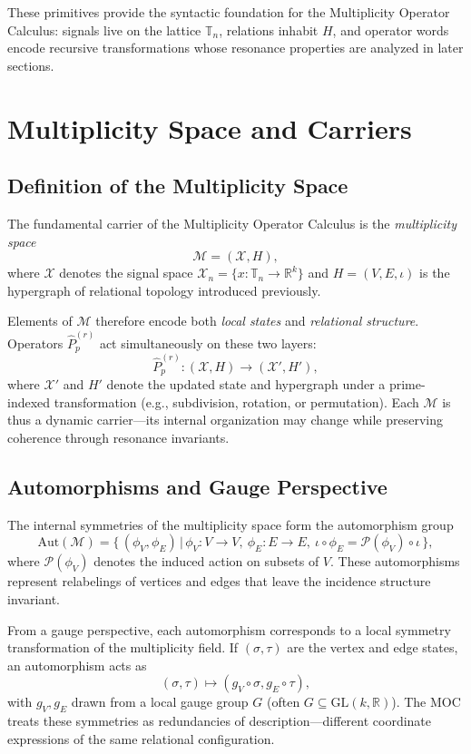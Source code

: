 \documentclass[12pt]{article}
\numberwithin{equation}{section}
\theoremstyle{plain}
\theoremstyle{definition}
\theoremstyle{remark}
\begin{document}
These primitives provide the syntactic foundation for the Multiplicity Operator Calculus: signals live on the lattice \(\mathbb{T}_n\), relations inhabit \(H\), and operator words encode recursive transformations whose resonance properties are analyzed in later sections.


\section*{Multiplicity Space and Carriers}

\subsection*{Definition of the Multiplicity Space}
The fundamental carrier of the Multiplicity Operator Calculus is the \emph{multiplicity space}
\[
\mathcal{M} = (\mathcal{X}, H),
\]
where \(\mathcal{X}\) denotes the signal space \(\mathcal{X}_n = \{x:\mathbb{T}_n \rightarrow \mathbb{R}^k\}\) and \(H = (V, E, \iota)\) is the hypergraph of relational topology introduced previously. 

Elements of \(\mathcal{M}\) therefore encode both \emph{local states} and \emph{relational structure}. Operators \(\hat{P}_p^{(r)}\) act simultaneously on these two layers:
\[
\hat{P}_p^{(r)} : (\mathcal{X}, H) \longrightarrow (\mathcal{X}', H'),
\]
where \(\mathcal{X}'\) and \(H'\) denote the updated state and hypergraph under a prime-indexed transformation (e.g., subdivision, rotation, or permutation).  
Each \(\mathcal{M}\) is thus a dynamic carrier—its internal organization may change while preserving coherence through resonance invariants.

\subsection*{Automorphisms and Gauge Perspective}
The internal symmetries of the multiplicity space form the automorphism group
\[
\mathrm{Aut}(\mathcal{M}) = \{\,(\phi_V, \phi_E)\,|\, \phi_V:V\rightarrow V,\ \phi_E:E\rightarrow E,\ 
\iota\circ \phi_E = \mathcal{P}(\phi_V)\circ \iota\,\},
\]
where \(\mathcal{P}(\phi_V)\) denotes the induced action on subsets of \(V\). These automorphisms represent relabelings of vertices and edges that leave the incidence structure invariant.  

From a gauge perspective, each automorphism corresponds to a local symmetry transformation of the multiplicity field. If \((\sigma,\tau)\) are the vertex and edge states, an automorphism acts as
\[
(\sigma,\tau) \mapsto (g_V\circ\sigma, g_E\circ\tau),
\]
with \(g_V,g_E\) drawn from a local gauge group \(G\) (often \(G\subseteq \mathrm{GL}(k,\mathbb{R})\)). The MOC treats these symmetries as redundancies of description—different coordinate expressions of the same relational configuration.  
\end{document}
